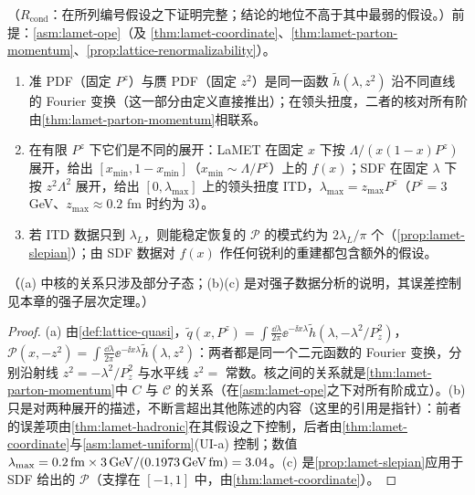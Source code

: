 \begin{proposition}\label{prop:lamet-sdf}
（$R_{\mathrm{cond}}$：在所列编号假设之下证明完整；结论的地位不高于其中最弱的假设。）前提：\cref{asm:lamet-ope}（及 \cref{thm:lamet-coordinate}、\cref{thm:lamet-parton-momentum}、\cref{prop:lattice-renormalizability}）。
\begin{enumerate}[label=(\alph*),leftmargin=2em,itemsep=1pt,topsep=2pt]
\item 准 PDF（固定 $P^z$）与赝 PDF（固定 $z^2$）是同一函数 $\tilde h(\lambda,z^2)$ 沿不同直线的 Fourier 变换（这一部分由定义直接推出）；在领头扭度，二者的核对所有阶由\cref{thm:lamet-parton-momentum}相联系。
\item 在有限 $P^z$ 下它们是不同的展开：LaMET 在固定 $x$ 下按 $\Lambda/(x(1-x)P^z)$ 展开，给出 $[x_{\min},1-x_{\min}]$（$x_{\min}\sim\Lambda/P^z$）上的 $f(x)$；SDF 在固定 $\lambda$ 下按 $z^2\Lambda^2$ 展开，给出 $[0,\lambda_{\max}]$ 上的领头扭度 ITD，$\lambda_{\max}=z_{\max}P^z$（$P^z=3$ GeV、$z_{\max}\approx0.2$ fm 时约为 $3$）。
\item 若 ITD 数据只到 $\lambda_L$，则能稳定恢复的 $\mathcal P$ 的模式约为 $2\lambda_L/\pi$ 个（\cref{prop:lamet-slepian}）；由 SDF 数据对 $f(x)$ 作任何锐利的重建都包含额外的假设。
\end{enumerate}
（(a) 中核的关系只涉及部分子态；(b)(c) 是对强子数据分析的说明，其误差控制见本章的强子层次定理。）
\end{proposition}

\begin{proof}
(a) 由\cref{def:lattice-quasi}，$\tilde q(x,P^z)=\int\frac{\dd\lambda}{2\pi}\ee^{-\ii x\lambda}\tilde h(\lambda,-\lambda^2/P_z^2)$，$\mathcal P(x,-z^2)=\int\frac{\dd\lambda}{2\pi}\ee^{-\ii x\lambda}\tilde h(\lambda,z^2)$：两者都是同一个二元函数的 Fourier 变换，分别沿射线 $z^2=-\lambda^2/P_z^2$ 与水平线 $z^2=$ 常数。核之间的关系就是\cref{thm:lamet-parton-momentum}中 $C$ 与 $\mathcal C$ 的关系（在\cref{asm:lamet-ope}之下对所有阶成立）。(b) 只是对两种展开的描述，不断言超出其他陈述的内容（这里的引用是指针）：前者的误差项由\cref{thm:lamet-hadronic}在其假设之下控制，后者由\cref{thm:lamet-coordinate}与\cref{asm:lamet-uniform}(UI-a) 控制；数值 $\lambda_{\max}=0.2\,{\rm fm}\times3\,{\rm GeV}/(0.1973\,{\rm GeV\,fm})=3.04$。(c) 是\cref{prop:lamet-slepian}应用于 SDF 给出的 $\mathcal P$（支撑在 $[-1,1]$ 中，由\cref{thm:lamet-coordinate}）。
\end{proof}

